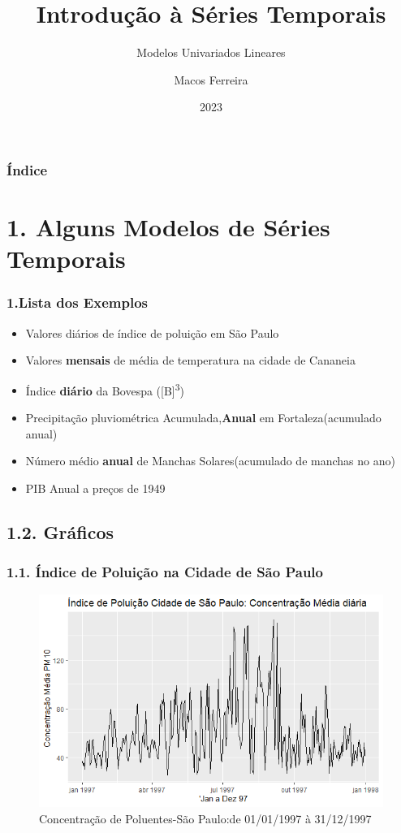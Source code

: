 \documentclass{beamer}
\title{Introdução à Séries Temporais}
\subtitle{Modelos Univariados Lineares}
\author{Macos Ferreira}
\institute{Universidade Mackenzie}
\date{2023}
\begin{document}
	\frame{\titlepage}
	\begin{frame}[allowframebreaks]
		\frametitle{Índice}
		\tableofcontents[hideallsubsections]
	\end{frame}
	\section{1. Alguns Modelos de Séries Temporais}
	 \begin{frame}
		\frametitle{1.Lista dos Exemplos}
		\begin{itemize}
			\item<1-> Valores diários de índice de poluição em São Paulo \cite{morettin2018analise}
			\item<1-> Valores \textbf{mensais} de média de temperatura na cidade de Cananeia 
			\item<1-> Índice \textbf{diário} da Bovespa ([B]\textsuperscript{3})
			\item<1-> Precipitação pluviométrica Acumulada,\textbf{Anual} em Fortaleza(acumulado anual)
			\item<1-> Número médio \textbf{anual} de Manchas Solares(acumulado de manchas no ano)
			\item<1-> PIB Anual a preços de 1949			
		\end{itemize}		
	\end{frame}
	
	\subsection{1.2. Gráficos}
	
	\begin{frame}
		\frametitle{1.1. Índice de Poluição na Cidade de São Paulo}
		\begin{figure}[!ht]
			\centering
			\includegraphics[width=0.7\linewidth]{apresentacao_series_temporais/images/Morettin_poluicao}
			\caption[Concentração de Poluentes-São Paulo:de 01/01/1997 à 31/12/1997]{Concentração de Poluentes-São Paulo:de 01/01/1997 à 31/12/1997}
			\label{fig:morettinpoluicao}
		\end{figure}	
	\end{frame}
\end{document}
